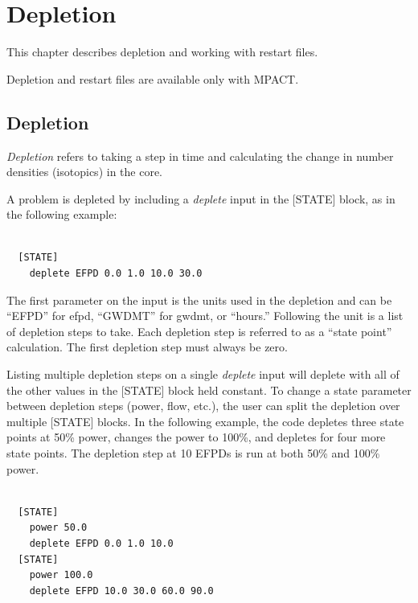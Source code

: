%
%
\section{Depletion}  \label{chap:depletion}

This chapter describes depletion and working with restart files.

Depletion and restart files are available only with MPACT.

\subsection{Depletion}

\textit{Depletion} refers to taking a step in time and calculating the change in number densities (isotopics) in the core.

A problem is depleted by including a {\it deplete} input in the [STATE] block,
as in the following example:
\begin{Verbatim}[fontsize=\small]

  [STATE]
    deplete EFPD 0.0 1.0 10.0 30.0

\end{Verbatim}
The first parameter on the input is the units used in the depletion and can be ``EFPD'' for \ac{efpd},
``GWDMT'' for \ac{gwdmt}, or ``hours.''
Following the unit is a list of depletion steps to take.
Each depletion step is referred to as a ``state point'' calculation.
The first depletion step must always be zero.

Listing multiple depletion steps on a single {\it deplete} input will deplete with all of the other
values in the [STATE] block held constant. To change a state parameter between
depletion steps (power, flow, etc.), the user can split the depletion over multiple [STATE] blocks.
In the following example, the code depletes three state points at 50\% power, changes the power
to 100\%, and depletes for four more state points.
The depletion step at 10 EFPDs is run at both 50\% and 100\% power.
\begin{Verbatim}[fontsize=\small]

  [STATE]
    power 50.0
    deplete EFPD 0.0 1.0 10.0
  [STATE]
    power 100.0
    deplete EFPD 10.0 30.0 60.0 90.0

\end{Verbatim}

